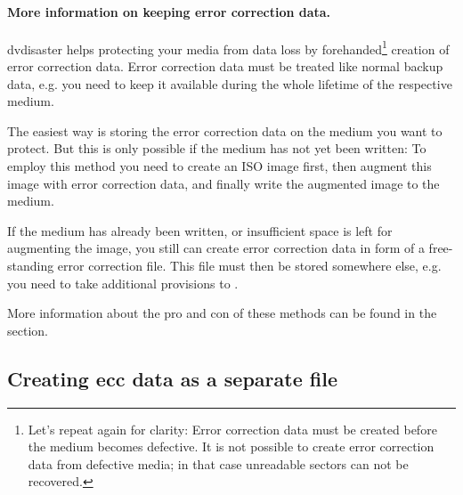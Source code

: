 \paragraph{More information on keeping error correction data.}\quad

dvdisaster helps protecting your media from data loss by
forehanded\footnote{ Let's repeat again for clarity: Error correction data
  must be created before the medium becomes defective. It is not possible
  to create error correction data from defective media; in that case
  unreadable sectors can not be recovered.} creation of error correction
data. Error correction data must be treated like normal backup data,
e.g. you need to keep it available during the whole lifetime of the
respective medium.

\smallskip

The easiest way is storing the error correction data on the medium
you want to protect. But this is only possible if the medium has not
yet been written: To employ this method you need to create an ISO image
first, then augment this image with error correction data, and finally
write the augmented image to the medium.

\smallskip

If the medium has already been written, or insufficient space is left
for augmenting the image, you still can create error correction data
in form of a free-standing error correction file. This file must then
be stored somewhere else, e.g. you need to take additional provisions
to .

\smallskip

More information about the pro and con of these methods can be found
in the  section. 

\newpage

\subsection{Creating ecc data as a separate file}
\label{howto-eccfile}


